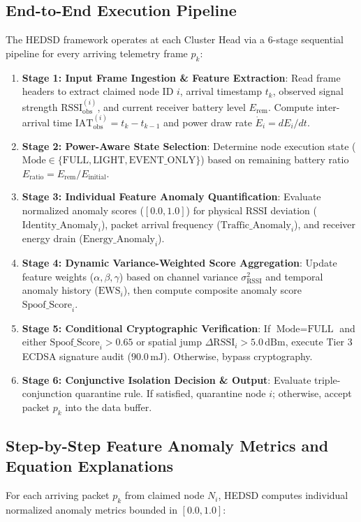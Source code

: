 \documentclass[conference]{IEEEtran}
\begin{document}
\subsection{End-to-End Execution Pipeline}
The HEDSD framework operates at each Cluster Head via a 6-stage sequential pipeline for every arriving telemetry frame $p_k$:
\begin{enumerate}
    \item \textbf{Stage 1: Input Frame Ingestion \& Feature Extraction}: Read frame headers to extract claimed node ID $i$, arrival timestamp $t_k$, observed signal strength $\text{RSSI}_{\text{obs}}^{(i)}$, and current receiver battery level $E_{\text{rem}}$. Compute inter-arrival time $\text{IAT}_{\text{obs}}^{(i)} = t_k - t_{k-1}$ and power draw rate $\dot{E}_i = dE_i/dt$.
    \item \textbf{Stage 2: Power-Aware State Selection}: Determine node execution state ($\text{Mode} \in \{\text{FULL}, \text{LIGHT}, \text{EVENT\_ONLY}\}$) based on remaining battery ratio $E_{\text{ratio}} = E_{\text{rem}} / E_{\text{initial}}$.
    \item \textbf{Stage 3: Individual Feature Anomaly Quantification}: Evaluate normalized anomaly scores ($[0.0, 1.0]$) for physical RSSI deviation ($\text{Identity\_Anomaly}_i$), packet arrival frequency ($\text{Traffic\_Anomaly}_i$), and receiver energy drain ($\text{Energy\_Anomaly}_i$).
    \item \textbf{Stage 4: Dynamic Variance-Weighted Score Aggregation}: Update feature weights ($\alpha, \beta, \gamma$) based on channel variance $\sigma_{\text{RSSI}}^2$ and temporal anomaly history ($\text{EWS}_i$), then compute composite anomaly score $\text{Spoof\_Score}_i$.
    \item \textbf{Stage 5: Conditional Cryptographic Verification}: If $\text{Mode} = \text{FULL}$ and either $\text{Spoof\_Score}_i > 0.65$ or spatial jump $\Delta\text{RSSI}_i > 5.0\,\text{dBm}$, execute Tier 3 ECDSA signature audit ($90.0\,\text{mJ}$). Otherwise, bypass cryptography.
    \item \textbf{Stage 6: Conjunctive Isolation Decision \& Output}: Evaluate triple-conjunction quarantine rule. If satisfied, quarantine node $i$; otherwise, accept packet $p_k$ into the data buffer.
\end{enumerate}

\subsection{Step-by-Step Feature Anomaly Metrics and Equation Explanations}
For each arriving packet $p_k$ from claimed node $N_i$, HEDSD computes individual normalized anomaly metrics bounded in $[0.0, 1.0]$:
\end{document}
